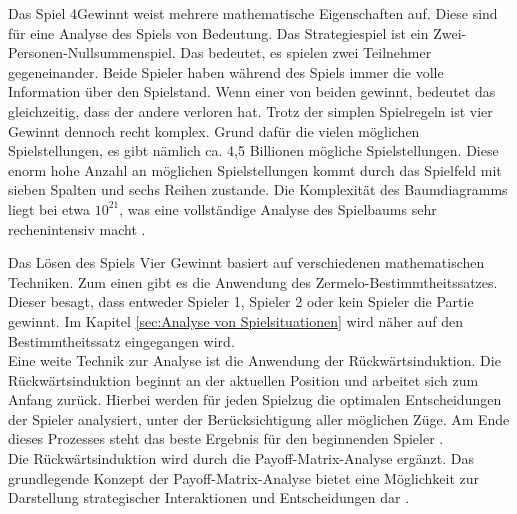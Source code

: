 Das Spiel 4Gewinnt weist mehrere mathematische Eigenschaften auf. Diese sind für eine Analyse des Spiels von Bedeutung. 
Das Strategiespiel ist ein Zwei-Personen-Nullsummenspiel. Das bedeutet, es spielen zwei Teilnehmer gegeneinander. Beide Spieler haben während des Spiels immer die volle Information über den Spielstand. Wenn einer von beiden gewinnt, bedeutet das gleichzeitig, dass der andere verloren hat.
Trotz der simplen Spielregeln ist vier Gewinnt dennoch recht komplex. Grund dafür die vielen möglichen Spielstellungen, es gibt nämlich ca. 4,5 Billionen mögliche Spielstellungen. Diese enorm hohe Anzahl an möglichen Spielstellungen kommt durch das Spielfeld mit sieben Spalten und sechs Reihen zustande.
Die Komplexität des Baumdiagramms liegt bei etwa $10^{21}$, was eine vollständige Analyse des Spielbaums sehr rechenintensiv macht \autocite{ruile2009viergewinnt}.

Das Lösen des Spiels Vier Gewinnt basiert auf verschiedenen mathematischen Techniken.
Zum einen gibt es die Anwendung des Zermelo-Bestimmtheitssatzes. Dieser besagt, dass entweder Spieler 1, Spieler 2 oder kein Spieler die Partie gewinnt. Im Kapitel \ref{sec:Analyse von Spielsituationen} wird näher auf den Bestimmtheitssatz eingegangen wird.\\
Eine weite Technik zur Analyse ist die Anwendung der Rückwärtsinduktion. Die Rückwärtsinduktion beginnt an der aktuellen Position und arbeitet sich zum Anfang zurück. Hierbei werden für jeden Spielzug die optimalen Entscheidungen der Spieler analysiert, unter der Berücksichtigung aller möglichen Züge.
Am Ende dieses Prozesses steht das beste Ergebnis für den beginnenden Spieler \autocite{mueller_2011}.\\
Die Rückwärtsinduktion wird durch die Payoff-Matrix-Analyse ergänzt. Das grundlegende Konzept der Payoff-Matrix-Analyse bietet eine Möglichkeit zur Darstellung strategischer Interaktionen und Entscheidungen dar \autocite{fasterCapital2024}.



